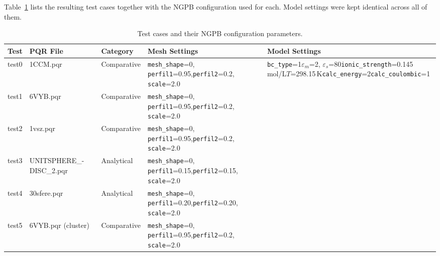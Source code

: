 Table~\ref{tab:test-cases} lists the resulting test cases together with the NGPB configuration used for each. Model settings were kept identical across all of them.

\begin{table}[htbp]
    \centering
    \footnotesize
    \begin{tabular}{p{0.9cm}p{2.8cm}p{2.0cm}p{2.8cm}p{4.7cm}}
        \toprule
        Test & PQR File & Category & Mesh Settings & Model Settings \\
        \midrule
        test0 & 1CCM.pqr & Comparative & \texttt{mesh\_shape}=0, \texttt{perfil1}=0.95,\newline\texttt{perfil2}=0.2, \texttt{scale}=2.0 &
        \multirow{6}{4.7cm}{\texttt{bc\_type}=1\newline$\varepsilon_m$=2, $\varepsilon_s$=80\newline\texttt{ionic\_strength}=0.145\,mol/L\newline$T$=298.15\,K\newline\texttt{calc\_energy}=2\newline\texttt{calc\_coulombic}=1} \\
        test1 & 6VYB.pqr & Comparative & \texttt{mesh\_shape}=0, \texttt{perfil1}=0.95,\newline\texttt{perfil2}=0.2, \texttt{scale}=2.0 & \\
        test2 & 1vsz.pqr & Comparative & \texttt{mesh\_shape}=0, \texttt{perfil1}=0.95,\newline\texttt{perfil2}=0.2, \texttt{scale}=2.0 & \\
        test3 & UNITSPHERE\_-\newline DISC\_2.pqr & Analytical & \texttt{mesh\_shape}=0, \texttt{perfil1}=0.15,\newline\texttt{perfil2}=0.15, \texttt{scale}=2.0 & \\
        test4 & 30sfere.pqr & Analytical & \texttt{mesh\_shape}=0, \texttt{perfil1}=0.20,\newline\texttt{perfil2}=0.20, \texttt{scale}=2.0 & \\
        test5 & 6VYB.pqr (cluster) & Comparative & \texttt{mesh\_shape}=0, \texttt{perfil1}=0.95,\newline\texttt{perfil2}=0.2, \texttt{scale}=2.0 & \\
        \bottomrule
    \end{tabular}
    \caption{Test cases and their NGPB configuration parameters.}
    \label{tab:test-cases}
\end{table}

